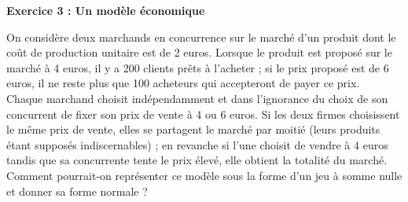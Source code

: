 \documentclass[12pt]{article}
\begin{document}
\begin{center}
\textbf{Exercice 3 : Un mod\`ele \'economique}
\end{center}
On consid\`ere deux marchands en concurrence sur le march\'e d’un produit dont le co\^ut de production unitaire est de 2 euros. 
Lorsque le produit est propos\'e sur le march\'e à 4 euros, il y a 200 clients pr\^ets à l’acheter ; si le prix propos\'e est de 6 euros, 
il ne reste plus que 100 acheteurs qui accepteront de payer ce prix.\\
Chaque marchand choisit ind\'ependamment et dans l’ignorance du choix de son concurrent de fixer son prix de vente à 4 ou 6 euros. 
Si les deux firmes choisissent le m\^eme prix de vente, elles se partagent le march\'e par moiti\'e (leurs produits étant suppos\'es indiscernables) ; 
en revanche si l’une choisit de vendre \`a 4 euros tandis que sa concurrente tente le prix \'elev\'e, elle obtient la totalit\'e du march\'e.\\
Comment pourrait-on repr\'esenter ce mod\`ele sous la forme d'un jeu \`a somme nulle et donner sa forme normale ?
\medskip
\medskip
\end{document}
